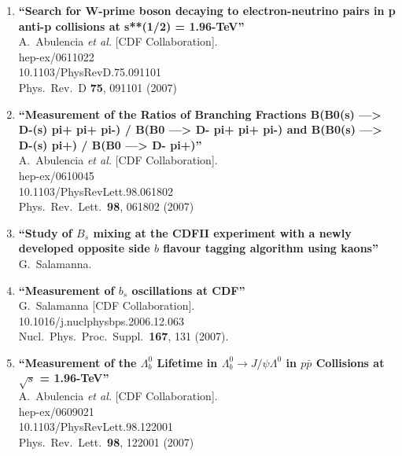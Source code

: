 \documentclass{article}
\begin{document}
\begin{enumerate}
\item%
{\bf ``Search for W-prime boson decaying to electron-neutrino pairs in p anti-p collisions at s**(1/2) = 1.96-TeV''}
  \\{}A.~Abulencia {\it et al.}  [CDF Collaboration].
  \\{}hep-ex/0611022
    \\{}10.1103/PhysRevD.75.091101
\\{}Phys.\ Rev.\ D {\bf 75}, 091101 (2007) %


\item%
{\bf ``Measurement of the Ratios of Branching Fractions B(B0(s) ---> D-(s) pi+ pi+ pi-) / B(B0 ---> D- pi+ pi+ pi-) and B(B0(s) ---> D-(s) pi+) / B(B0 ---> D- pi+)''}
  \\{}A.~Abulencia {\it et al.}  [CDF Collaboration].
  \\{}hep-ex/0610045
    \\{}10.1103/PhysRevLett.98.061802
\\{}Phys.\ Rev.\ Lett.\  {\bf 98}, 061802 (2007) %


\item%
{\bf ``Study of $B_s$ mixing at the CDFII experiment with a newly developed opposite side $b$ flavour tagging algorithm using kaons''}
  \\{}G.~Salamanna.
  


\item%
{\bf ``Measurement of $b_s$ oscillations at CDF''}
  \\{}G.~Salamanna [CDF Collaboration].
    \\{}10.1016/j.nuclphysbps.2006.12.063
\\{}Nucl.\ Phys.\ Proc.\ Suppl.\  {\bf 167}, 131 (2007). %


\item%
{\bf ``Measurement of the $\Lambda^0_{b}$ Lifetime in $\Lambda^0_{b} \to J/\psi \Lambda^0$ in $p \bar{p}$ Collisions at $\sqrt{s}$ = 1.96-TeV''}
  \\{}A.~Abulencia {\it et al.}  [CDF Collaboration].
  \\{}hep-ex/0609021
    \\{}10.1103/PhysRevLett.98.122001
\\{}Phys.\ Rev.\ Lett.\  {\bf 98}, 122001 (2007) %



\end{enumerate}
\end{document}
